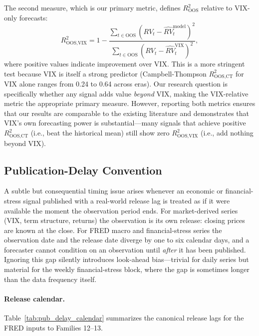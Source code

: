 \documentclass[12pt,a4paper]{article}
\begin{document}
The second measure, which is our primary metric, defines $R^2_{\text{OOS}}$ relative to VIX-only forecasts:
\begin{equation}
R^2_{\text{OOS,VIX}} = 1 - \frac{\sum_{t \in \text{OOS}} (RV_t - \hat{RV}_t^{\text{model}})^2}{\sum_{t \in \text{OOS}} (RV_t - \hat{RV}_t^{\text{VIX}})^2},
\label{eq:oos_r2}
\end{equation}
where positive values indicate improvement over VIX. This is a more stringent test because VIX is itself a strong predictor (Campbell-Thompson $R^2_{\text{OOS,CT}}$ for VIX alone ranges from 0.24 to 0.64 across eras). Our research question is specifically whether any signal adds value \emph{beyond} VIX, making the VIX-relative metric the appropriate primary measure. However, reporting both metrics ensures that our results are comparable to the existing literature and demonstrates that VIX's own forecasting power is substantial---many signals that achieve positive $R^2_{\text{OOS,CT}}$ (i.e., beat the historical mean) still show zero $R^2_{\text{OOS,VIX}}$ (i.e., add nothing beyond VIX).

\subsection{Publication-Delay Convention}
\label{sec:pub_delay}

A subtle but consequential timing issue arises whenever an economic or financial-stress signal published with a real-world release lag is treated as if it were available the moment the observation period ends. For market-derived series (VIX, term structure, returns) the observation is its own release: closing prices are known at the close. For FRED macro and financial-stress series the observation date and the release date diverge by one to six calendar days, and a forecaster cannot condition on an observation until \emph{after} it has been published. Ignoring this gap silently introduces look-ahead bias---trivial for daily series but material for the weekly financial-stress block, where the gap is sometimes longer than the data frequency itself.

\paragraph{Release calendar.} Table~\ref{tab:pub_delay_calendar} summarizes the canonical release lags for the FRED inputs to Families 12--13.
\end{document}

